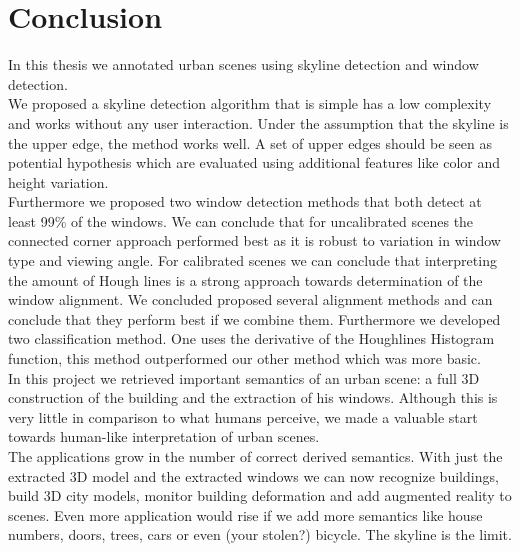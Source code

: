 \section{Conclusion}
In this thesis we annotated urban scenes using skyline detection and window
detection.\\

We proposed a skyline detection algorithm that is simple has a low complexity
and works without any user interaction.  Under the assumption that the skyline is the upper edge, the method works well.  A set of upper edges should be seen
as potential hypothesis which are evaluated using additional features like color
and height variation.\\

Furthermore we proposed two window detection methods that both detect at least
99\% of the windows.  We can conclude that for uncalibrated scenes the connected
corner approach performed best as it is robust to variation in window type and
viewing angle.  For calibrated scenes we can conclude that 
interpreting the amount of Hough lines is a strong approach
towards determination of the window alignment. 
We concluded proposed several alignment methods and can conclude that they
perform best if we combine them.
Furthermore we developed two classification method. One uses the derivative of
the Houghlines Histogram function, this method outperformed our other method
which was more basic.\\

In this project we retrieved important semantics of an urban scene: a
full 3D construction of the building and the extraction of his windows.
Although this is very little in comparison to what humans perceive, we made a
valuable start towards human-like interpretation of urban scenes.\\

The applications grow in the number of correct derived semantics. With just the
extracted 3D model and the extracted windows we can now recognize buildings,
build 3D city models, monitor building deformation and add augmented reality
to scenes.  Even more application would rise if we add more semantics like
house numbers, doors, trees, cars or even (your stolen?) bicycle. The skyline is
the limit.


